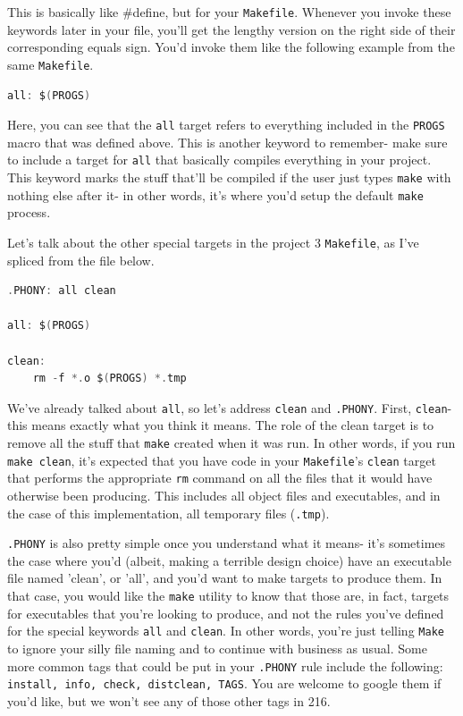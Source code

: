 \documentclass[english, 10pt]{article}
\begin{document}
This is basically like \#define, but for your \texttt{Makefile}. Whenever you invoke these keywords later in your file, you'll get the lengthy version on the right side of their corresponding equals sign. You'd invoke them like the following example from the same \texttt{Makefile}.

\begin{lstlisting}[language=C]
all: $(PROGS)
\end{lstlisting}

Here, you can see that the \texttt{all} target refers to everything included in the \texttt{PROGS} macro that was defined above. This is another keyword to remember- make sure to include a target for \texttt{all} that basically compiles everything in your project. This keyword marks the stuff that'll be compiled if the user just types \texttt{make} with nothing else after it- in other words, it's where you'd setup the default \texttt{make} process.\newline

Let's talk about the other special targets in the project 3 \texttt{Makefile}, as I've spliced from the file below.

\begin{lstlisting}[language=C]
.PHONY: all clean

all: $(PROGS)

clean:
	rm -f *.o $(PROGS) *.tmp

\end{lstlisting}

We've already talked about \texttt{all}, so let's address \texttt{clean} and \texttt{.PHONY}. First, \texttt{clean}- this means exactly what you think it means. The role of the clean target is to remove all the stuff that \texttt{make} created when it was run. In other words, if you run \texttt{make clean}, it's expected that you have code in your \texttt{Makefile}'s \texttt{clean} target that performs the appropriate \texttt{rm} command on all the files that it would have otherwise been producing. This includes all object files and executables, and in the case of this implementation, all temporary files (\texttt{.tmp}).\newline

\texttt{.PHONY} is also pretty simple once you understand what it means- it's sometimes the case where you'd (albeit, making a terrible design choice) have an executable file named 'clean', or 'all', and you'd want to make targets to produce them. In that case, you would like the \texttt{make} utility to know that those are, in fact, targets for executables that you're looking to produce, and not the rules you've defined for the special keywords \texttt{all} and \texttt{clean}. In other words, you're just telling \texttt{Make} to ignore your silly file naming and to continue with business as usual. Some more common tags that could be put in your \texttt{.PHONY} rule include the following: \texttt{install, info, check, distclean, TAGS}. You are welcome to google them if you'd like, but we won't see any of those other tags in 216.
\end{document}
